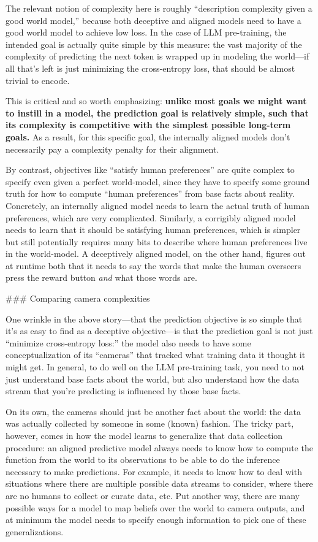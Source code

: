 {The relevant notion of complexity here is roughly ``description complexity given a good world model,'' because both deceptive and aligned models need to have a good world model to achieve low loss. In the case of LLM pre-training, the intended goal is actually quite simple by this measure: the vast majority of the complexity of predicting the next token is wrapped up in modeling the world---if all that's left is just minimizing the cross-entropy loss, that should be almost trivial to encode.

This is critical and so worth emphasizing: \textbf{unlike most goals we might want to instill in a model, the prediction goal is relatively simple, such that its complexity is competitive with the simplest possible long-term goals.} As a result, for this specific goal, the internally aligned models don't necessarily pay a complexity penalty for their alignment.

By contrast, objectives like ``satisfy human preferences'' are quite complex to specify even given a perfect world-model, since they have to specify some ground truth for how to compute ``human preferences'' from base facts about reality. Concretely, an internally aligned model needs to learn the actual truth of human preferences, which are very complicated. Similarly, a corrigibly aligned model needs to learn that it should be satisfying human preferences, which is simpler but still potentially requires many bits to describe where human preferences live in the world-model. A deceptively aligned model, on the other hand, figures out at runtime both that it needs to say the words that make the human overseers press the reward button \textit{and} what those words are.


### Comparing camera complexities

One wrinkle in the above story---that the prediction objective is so simple that it's as easy to find as a deceptive objective---is that the prediction goal is not just ``minimize cross-entropy loss:'' the model also needs to have some conceptualization of its ``cameras'' that tracked what training data it thought it might get. In general, to do well on the LLM pre-training task, you need to not just understand base facts about the world, but also understand how the data stream that you're predicting is influenced by those base facts.

On its own, the cameras should just be another fact about the world: the data was actually collected by someone in some (known) fashion. The tricky part, however, comes in how the model learns to generalize that data collection procedure: an aligned predictive model always needs to know how to compute the function from the world to its observations to be able to do the inference necessary to make predictions. For example, it needs to know how to deal with situations where there are multiple possible data streams to consider, where there are no humans to collect or curate data, etc. Put another way, there are many possible ways for a model to map beliefs over the world to camera outputs, and at minimum the model needs to specify enough information to pick one of these generalizations.

}

